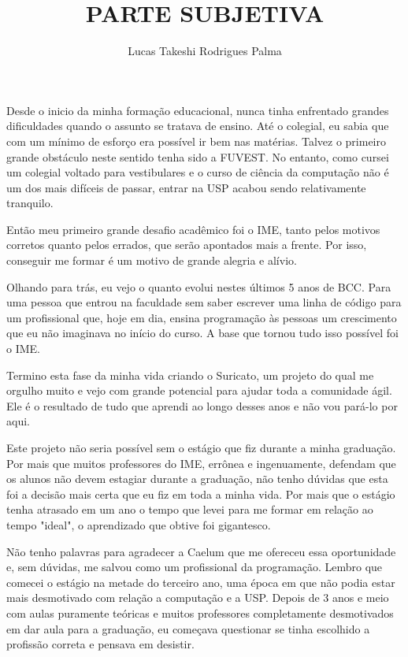 \documentclass[titlepage,a4paper]{article}
\title{PARTE SUBJETIVA}
\author{Lucas Takeshi Rodrigues Palma}
\newcommand{\suricato}{Suricato}
\begin{document}
\maketitle

Desde o inicio da minha formação educacional, nunca tinha enfrentado grandes dificuldades quando o assunto se tratava de ensino. Até o colegial, eu sabia que com um mínimo de esforço era possível ir bem nas matérias. Talvez o primeiro grande obstáculo neste sentido tenha sido a FUVEST. No entanto, como cursei um colegial voltado para vestibulares e o curso de ciência da computação não é um dos mais difíceis de passar, entrar na USP acabou sendo relativamente tranquilo.

Então meu primeiro grande desafio acadêmico foi o IME, tanto pelos motivos corretos quanto pelos errados, que serão apontados mais a frente. Por isso, conseguir me formar é um motivo de grande alegria e alívio.

Olhando para trás, eu vejo o quanto evolui nestes últimos 5 anos de BCC. Para uma pessoa que entrou na faculdade sem saber escrever uma linha de código para um profissional que, hoje em dia, ensina programação às pessoas um crescimento que eu não imaginava no início do curso. A base que tornou tudo isso possível foi o IME.

Termino esta fase da minha vida criando o \suricato{}, um projeto do qual me orgulho muito e vejo com grande potencial para ajudar toda a comunidade ágil. Ele é o resultado de tudo que aprendi ao longo desses anos e não vou pará-lo por aqui.

Este projeto não seria possível sem o estágio que fiz durante a minha graduação. Por mais que muitos professores do IME, errônea e ingenuamente, defendam que os alunos não devem estagiar durante a graduação, não tenho dúvidas que esta foi a decisão mais certa que eu fiz em toda a minha vida. Por mais que o estágio tenha atrasado em um ano o tempo que levei para me formar em relação ao tempo "ideal", o aprendizado que obtive foi gigantesco.

Não tenho palavras para agradecer a Caelum que me ofereceu essa oportunidade e, sem dúvidas, me salvou como um profissional da programação. Lembro que comecei o estágio na metade do terceiro ano, uma época em que não podia estar mais desmotivado com relação a computação e a USP. Depois de 3 anos e meio com aulas puramente teóricas e muitos professores completamente desmotivados em dar aula para a graduação, eu começava questionar se tinha escolhido a profissão correta e pensava em desistir. 
\end{document}
